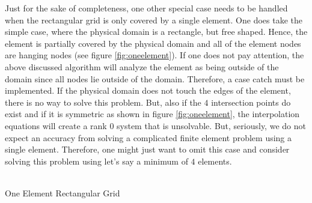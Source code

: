 \documentclass[a4paper,12pt]{article}
\makeatletter
\newenvironment{figurehere}
  {\def\@captype{figure}}
  {}
\makeatother
\begin{document}
Just for the sake of completeness, one other special case needs to be handled when the rectangular grid is only covered by a single element. One does take the simple case, where the physical domain is a rectangle, but free shaped. Hence, the element is partially covered by the physical domain and all of the element nodes are hanging nodes (see figure \ref{fig:oneelement}). If one does not pay attention, the above discussed algorithm will analyze the element as being outside of the domain since all nodes lie outside of the domain. Therefore, a case catch must be implemented. If the physical domain does not touch the edges of the element, there is no way to solve this problem. But, also if the $4$ intersection points do exist and if it is symmetric as shown in figure \ref{fig:oneelement}, the interpolation equations will create a rank $0$ system that is unsolvable. But, seriously, we do not expect an accuracy from solving a complicated finite element problem using a single element. Therefore, one might just want to omit this case and consider solving this problem using let's say a minimum of $4$ elements.
\begin{center}
\begin{figurehere} 
\\
\caption{One Element Rectangular Grid}\label{fig:oneelement}
\end{figurehere}
\end{center}
\end{document}

